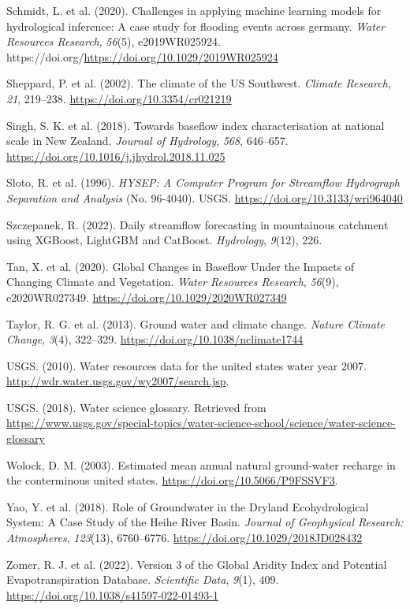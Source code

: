 \documentclass[
]{agujournal2019}
\newlength{\cslhangindent}
\newenvironment{CSLReferences}[2] %
 {\begin{list}{}{%
  \setlength{\itemindent}{0pt}
  \setlength{\leftmargin}{0pt}
  \setlength{\parsep}{0pt}
  \ifodd #1
   \setlength{\leftmargin}{\cslhangindent}
   \setlength{\itemindent}{-1\cslhangindent}
  \fi
  \setlength{\itemsep}{#2\baselineskip}}}
 {\end{list}}
\begin{document}
\begin{CSLReferences}{1}{0}
Schmidt, L. et al. (2020). Challenges in applying machine learning
models for hydrological inference: A case study for flooding events
across germany. \emph{Water Resources Research}, \emph{56}(5),
e2019WR025924.
https://doi.org/\url{https://doi.org/10.1029/2019WR025924}

Sheppard, P. et al. (2002). The climate of the US Southwest.
\emph{Climate Research}, \emph{21}, 219--238.
\url{https://doi.org/10.3354/cr021219}

Singh, S. K. et al. (2018). Towards baseflow index characterisation at
national scale in New Zealand. \emph{Journal of Hydrology}, \emph{568},
646--657. \url{https://doi.org/10.1016/j.jhydrol.2018.11.025}

Sloto, R. et al. (1996). \emph{HYSEP: A Computer Program for Streamflow
Hydrograph Separation and Analysis} (No. 96-4040). {USGS}.
\url{https://doi.org/10.3133/wri964040}

Szczepanek, R. (2022). Daily streamflow forecasting in mountainous
catchment using XGBoost, LightGBM and CatBoost. \emph{Hydrology},
\emph{9}(12), 226.

Tan, X. et al. (2020). Global Changes in Baseflow Under the Impacts of
Changing Climate and Vegetation. \emph{Water Resources Research},
\emph{56}(9), e2020WR027349. \url{https://doi.org/10.1029/2020WR027349}

Taylor, R. G. et al. (2013). Ground water and climate change.
\emph{Nature Climate Change}, \emph{3}(4), 322--329.
\url{https://doi.org/10.1038/nclimate1744}

USGS. (2010). Water resources data for the united states water year
2007. \url{http://wdr.water.usgs.gov/wy2007/search.jsp}.

USGS. (2018). Water science glossary. Retrieved from
\url{https://www.usgs.gov/special-topics/water-science-school/science/water-science-glossary}

Wolock, D. M. (2003). Estimated mean annual natural ground-water
recharge in the conterminous united states.
\url{https://doi.org/10.5066/P9FSSVF3}.

Yao, Y. et al. (2018). Role of Groundwater in the Dryland
Ecohydrological System: A Case Study of the Heihe River Basin.
\emph{Journal of Geophysical Research: Atmospheres}, \emph{123}(13),
6760--6776. \url{https://doi.org/10.1029/2018JD028432}

Zomer, R. J. et al. (2022). Version 3 of the Global Aridity Index and
Potential Evapotranspiration Database. \emph{Scientific Data},
\emph{9}(1), 409. \url{https://doi.org/10.1038/s41597-022-01493-1}

\end{CSLReferences}
\end{document}
